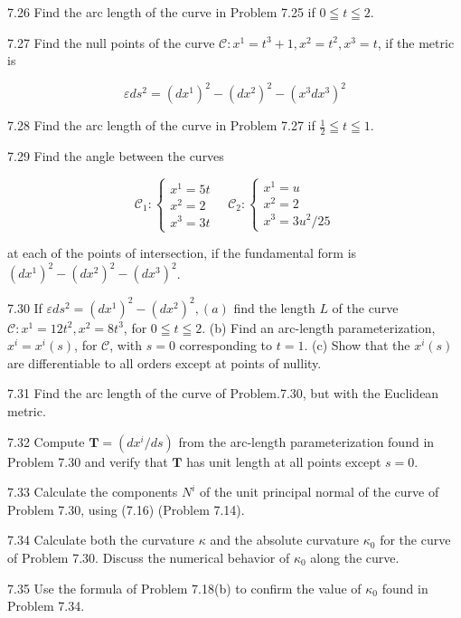 \documentclass[10pt]{article}
\begin{document}
7.26 Find the arc length of the curve in Problem 7.25 if $0 \leqq t \leqq 2$.

7.27 Find the null points of the curve $\mathscr{C}: x^{1}=t^{3}+1, x^{2}=t^{2}, x^{3}=t$, if the metric is

$$
\varepsilon d s^{2}=\left(d x^{1}\right)^{2}-\left(d x^{2}\right)^{2}-\left(x^{3} d x^{3}\right)^{2}
$$

7.28 Find the arc length of the curve in Problem 7.27 if $\frac{1}{2} \leqq t \leqq 1$.

7.29 Find the angle between the curves

$$
\mathscr{C}_{1}:\left\{\begin{array}{l}
x^{1}=5 t \\
x^{2}=2 \\
x^{3}=3 t
\end{array} \quad \mathscr{C}_{2}:\left\{\begin{array}{l}
x^{1}=u \\
x^{2}=2 \\
x^{3}=3 u^{2} / 25
\end{array}\right.\right.
$$

at each of the points of intersection, if the fundamental form is $\left(d x^{1}\right)^{2}-\left(d x^{2}\right)^{2}-\left(d x^{3}\right)^{2}$.

7.30 If $\varepsilon d s^{2}=\left(d x^{1}\right)^{2}-\left(d x^{2}\right)^{2},(a)$ find the length $L$ of the curve $\mathscr{C}: x^{1}=12 t^{2}, x^{2}=8 t^{3}$, for $0 \leqq t \leqq 2$. (b) Find an arc-length parameterization, $x^{i}=x^{i}(s)$, for $\mathscr{C}$, with $s=0$ corresponding to $t=1$. (c) Show that the $x^{i}(s)$ are differentiable to all orders except at points of nullity.

7.31 Find the arc length of the curve of Problem.7.30, but with the Euclidean metric.

7.32 Compute $\mathbf{T}=\left(d x^{i} / d s\right)$ from the arc-length parameterization found in Problem 7.30 and verify that $\mathbf{T}$ has unit length at all points except $s=0$.

7.33 Calculate the components $N^{i}$ of the unit principal normal of the curve of Problem 7.30, using (7.16) (Problem 7.14).

7.34 Calculate both the curvature $\kappa$ and the absolute curvature $\kappa_{0}$ for the curve of Problem 7.30. Discuss the numerical behavior of $\kappa_{0}$ along the curve.

7.35 Use the formula of Problem 7.18(b) to confirm the value of $\kappa_{0}$ found in Problem 7.34.
\end{document}
